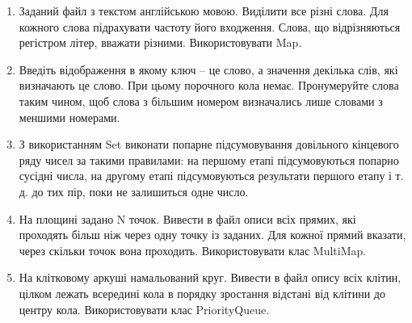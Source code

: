 \documentclass[]{article}
\begin{document}
\begin{enumerate}
\def\labelenumi{\arabic{enumi}.}
\item
  Заданий файл з текстом англійською мовою. Виділити все різні слова.
  Для кожного слова підрахувати частоту його входження. Слова, що
  відрізняються регістром літер, вважати різними. Використовувати Map.
\item
  Введіть відображення в якому ключ -- це слово, а значення декілька
  слів, які визначають це слово. При цьому порочного кола немає.
  Пронумеруйте слова таким чином, щоб слова з більшим номером
  визначались лише словами з меншими номерами.
\item
  З використанням Set виконати попарне підсумовування довільного
  кінцевого ряду чисел за такими правилами: на першому етапі
  підсумовуються попарно сусідні числа, на другому етапі підсумовуються
  результати першого етапу і т. д. до тих пір, поки не залишиться одне
  число.

\item
На площині задано N точок. Вивести
в файл описи всіх прямих, які проходять більш ніж через одну точку із
заданих. Для кожної прямий вказати, через скільки точок вона проходить.
Використовувати клас MultiMap.

\item
На клітковому аркуші намальований
круг. Вивести в файл опису всіх клітин, цілком лежать всередині кола в
порядку зростання відстані від клітини до центру кола. Використовувати
клас PriorityQueue.


\end{enumerate}
\end{document}
